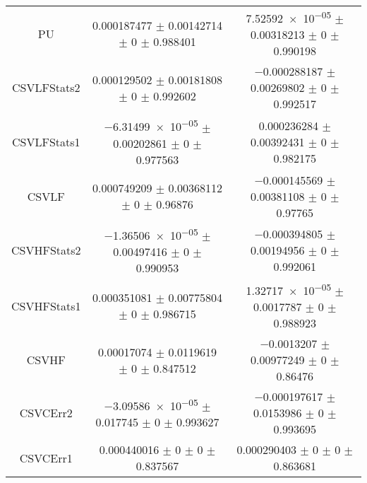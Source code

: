 \begin{table}
\begin{tabular}{ccc}
PU & \num{0.000187477} $\pm$ \num{0.00142714} $\pm$ \num{0} $\pm$ \num{0.988401} & \num{7.52592e-05} $\pm$ \num{0.00318213} $\pm$ \num{0} $\pm$ \num{0.990198}\\
CSVLFStats2 & \num{0.000129502} $\pm$ \num{0.00181808} $\pm$ \num{0} $\pm$ \num{0.992602} & \num{-0.000288187} $\pm$ \num{0.00269802} $\pm$ \num{0} $\pm$ \num{0.992517}\\
CSVLFStats1 & \num{-6.31499e-05} $\pm$ \num{0.00202861} $\pm$ \num{0} $\pm$ \num{0.977563} & \num{0.000236284} $\pm$ \num{0.00392431} $\pm$ \num{0} $\pm$ \num{0.982175}\\
CSVLF & \num{0.000749209} $\pm$ \num{0.00368112} $\pm$ \num{0} $\pm$ \num{0.96876} & \num{-0.000145569} $\pm$ \num{0.00381108} $\pm$ \num{0} $\pm$ \num{0.97765}\\
CSVHFStats2 & \num{-1.36506e-05} $\pm$ \num{0.00497416} $\pm$ \num{0} $\pm$ \num{0.990953} & \num{-0.000394805} $\pm$ \num{0.00194956} $\pm$ \num{0} $\pm$ \num{0.992061}\\
CSVHFStats1 & \num{0.000351081} $\pm$ \num{0.00775804} $\pm$ \num{0} $\pm$ \num{0.986715} & \num{1.32717e-05} $\pm$ \num{0.0017787} $\pm$ \num{0} $\pm$ \num{0.988923}\\
CSVHF & \num{0.00017074} $\pm$ \num{0.0119619} $\pm$ \num{0} $\pm$ \num{0.847512} & \num{-0.0013207} $\pm$ \num{0.00977249} $\pm$ \num{0} $\pm$ \num{0.86476}\\
CSVCErr2 & \num{-3.09586e-05} $\pm$ \num{0.017745} $\pm$ \num{0} $\pm$ \num{0.993627} & \num{-0.000197617} $\pm$ \num{0.0153986} $\pm$ \num{0} $\pm$ \num{0.993695}\\
CSVCErr1 & \num{0.000440016} $\pm$ \num{0} $\pm$ \num{0} $\pm$ \num{0.837567} & \num{0.000290403} $\pm$ \num{0} $\pm$ \num{0} $\pm$ \num{0.863681}\\
\bottomrule
\end{tabular}
\end{table}